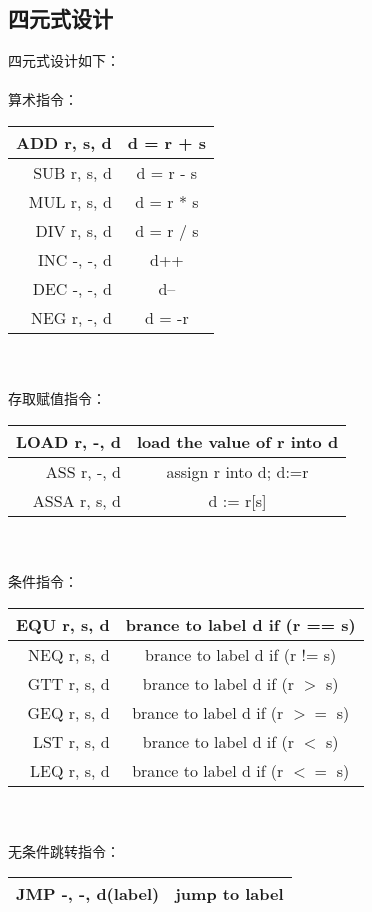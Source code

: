 \subsection{四元式设计}
四元式设计如下：\\
\vbox{}\\
算术指令：\\
\begin{tabular}{r|c}
  \hline
  ADD  r, s, d & d = r + s \\ \hline
  SUB  r, s, d & d = r - s \\ \hline
  MUL  r, s, d & d = r * s \\ \hline
  DIV  r, s, d & d = r / s \\ \hline
  INC  -, -, d & d++       \\ \hline
  DEC  -, -, d & d--       \\ \hline
  NEG  r, -, d & d = -r    \\ \hline
\end{tabular} \\
\vbox{}\\
存取赋值指令：\\
\begin{tabular}{r|c}
  \hline
  LOAD  r, -, d & load the value of r into d \\ \hline
  ASS   r, -, d & assign r into d; d:=r \\ \hline
  ASSA  r, s, d & d := r[s] \\ \hline
\end{tabular} \\
\vbox{}\\
条件指令：\\
\begin{tabular}{r|c}
  \hline
  EQU  r, s, d & brance to label d if (r == s) \\ \hline
  NEQ  r, s, d & brance to label d if (r != s) \\ \hline
  GTT  r, s, d & brance to label d if (r $>$ s)\\ \hline
  GEQ  r, s, d & brance to label d if (r $>=$ s)\\ \hline
  LST  r, s, d & brance to label d if (r $<$ s) \\ \hline
  LEQ  r, s, d & brance to label d if (r $<=$ s)\\ \hline
\end{tabular} \\
\vbox{}\\
无条件跳转指令：\\
\begin{tabular}{r|c}
  \hline
  JMP  -, -, d(label) & jump to label\\ \hline
\end{tabular}\\
